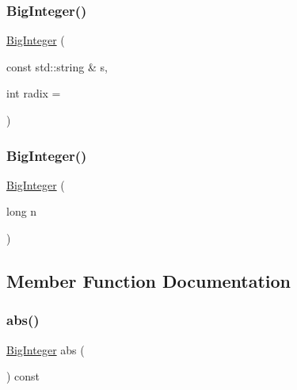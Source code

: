 \mbox{\label{classBigInteger_aa54e846a6f657634a4554b9540b339e4}} 
\subsubsection{\texorpdfstring{Big\+Integer()}{BigInteger()}\hspace{0.1cm}{\footnotesize\ttfamily [3/4]}}
{\footnotesize\ttfamily \mbox{\hyperlink{classBigInteger}{Big\+Integer}} (\begin{DoxyParamCaption}\item[{const std\+::string \&}]{s,  }\item[{int}]{radix = {} }\end{DoxyParamCaption})}

\mbox{\label{classBigInteger_a647b32454d89f386f4e8d3137d4e5526}} 
\subsubsection{\texorpdfstring{Big\+Integer()}{BigInteger()}\hspace{0.1cm}{\footnotesize\ttfamily [4/4]}}
{\footnotesize\ttfamily \mbox{\hyperlink{classBigInteger}{Big\+Integer}} (\begin{DoxyParamCaption}\item[{long}]{n }\end{DoxyParamCaption})}



\subsection{Member Function Documentation}
\mbox{\label{classBigInteger_aa60f0a3be5766293b78752ac6d7430fe}} 
\subsubsection{\texorpdfstring{abs()}{abs()}}
{\footnotesize\ttfamily \mbox{\hyperlink{classBigInteger}{Big\+Integer}} abs (\begin{DoxyParamCaption}{ }\end{DoxyParamCaption}) const}



